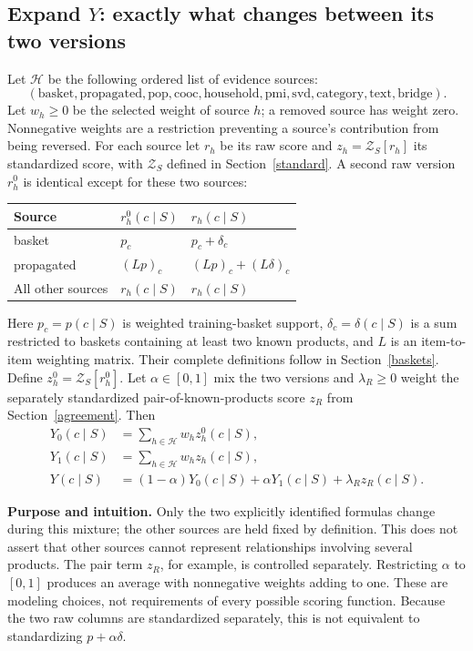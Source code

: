 \documentclass[11pt,a4paper]{article}
\newcommand{\why}{\par\textbf{Purpose and intuition.} }
\numberwithin{equation}{section}
\begin{document}
\subsection{Expand $Y$: exactly what changes between its two versions}
Let $\mathcal H$ be the following ordered list of evidence sources:
\[
(\mathrm{basket,propagated,pop,cooc,household,pmi,svd,category,text,bridge}).
\]
Let $w_h\ge0$ be the selected weight of source $h$; a removed source has weight zero.
Nonnegative weights are a restriction preventing a source's contribution from being reversed.
For each source let $r_h$ be its raw score and $z_h=\mathcal Z_S[r_h]$ its standardized
score, with $\mathcal Z_S$ defined in Section~\ref{standard}. A second raw version $r_h^0$
is identical except for these two sources:
\begin{center}\small
\begin{tabular}{@{}lll@{}}\toprule
Source & $r_h^0(c\mid S)$ & $r_h(c\mid S)$ \\\midrule
basket & $p_c$ & $p_c+\delta_c$ \\
propagated & $(Lp)_c$ & $(Lp)_c+(L\delta)_c$ \\
All other sources & $r_h(c\mid S)$ & $r_h(c\mid S)$ \\\bottomrule
\end{tabular}\end{center}
Here $p_c=p(c\mid S)$ is weighted training-basket support, $\delta_c=\delta(c\mid S)$
is a sum restricted to baskets containing at least two known products, and $L$ is an
item-to-item weighting matrix. Their complete definitions follow in Section~\ref{baskets}.
Define $z_h^0=\mathcal Z_S[r_h^0]$. Let $\alpha\in[0,1]$ mix the two versions and
$\lambda_R\ge0$ weight the separately standardized pair-of-known-products score $z_R$
from Section~\ref{agreement}. Then
\begin{align}
Y_0(c\mid S)&=\sum_{h\in\mathcal H}w_hz_h^0(c\mid S),\\
Y_1(c\mid S)&=\sum_{h\in\mathcal H}w_hz_h(c\mid S),\\
Y(c\mid S)&=(1-\alpha)Y_0(c\mid S)+\alpha Y_1(c\mid S)
             +\lambda_R z_R(c\mid S).\label{Y}
\end{align}
\why Only the two explicitly identified formulas change during this mixture; the other
sources are held fixed by definition. This does not assert that other sources cannot
represent relationships involving several products. The pair term $z_R$, for example,
is controlled separately. Restricting $\alpha$ to $[0,1]$ produces an average with
nonnegative weights adding to one. These are modeling choices, not requirements of every
possible scoring function. Because the two raw columns are standardized separately,
this is not equivalent to standardizing $p+\alpha\delta$.
\end{document}
